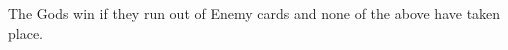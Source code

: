 \documentclass[12pt]{article}
\begin{document}
\begin{mdframed}[style = customFrame]
\begin{multicols*}{2}
\noindent
The Gods win if they run out of Enemy cards and none of the above have taken place.

\end{multicols*}
\end{mdframed}
\end{document}
